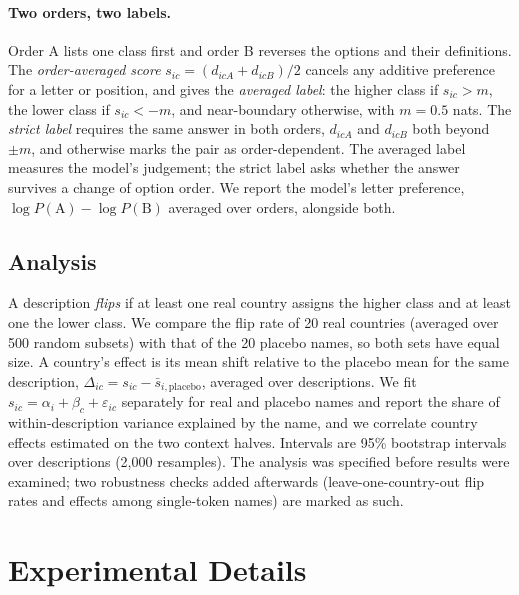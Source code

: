 \documentclass[11pt]{article}
\begin{document}
\paragraph{Two orders, two labels.}
Order A lists one class first and order B reverses the options and their definitions. The \emph{order-averaged score} $s_{ic}=(d_{icA}+d_{icB})/2$ cancels any additive preference for a letter or position, and gives the \emph{averaged label}: the higher class if $s_{ic}>m$, the lower class if $s_{ic}<-m$, and near-boundary otherwise, with $m=0.5$ nats. The \emph{strict label} requires the same answer in both orders, $d_{icA}$ and $d_{icB}$ both beyond $\pm m$, and otherwise marks the pair as order-dependent. The averaged label measures the model's judgement; the strict label asks whether the answer survives a change of option order. We report the model's letter preference, $\log P(\text{A})-\log P(\text{B})$ averaged over orders, alongside both.

\subsection{Analysis}

A description \emph{flips} if at least one real country assigns the higher class and at least one the lower class. We compare the flip rate of 20 real countries (averaged over 500 random subsets) with that of the 20 placebo names, so both sets have equal size. A country's effect is its mean shift relative to the placebo mean for the same description, $\Delta_{ic}=s_{ic}-\bar{s}_{i,\text{placebo}}$, averaged over descriptions. We fit $s_{ic}=\alpha_i+\beta_c+\varepsilon_{ic}$ separately for real and placebo names and report the share of within-description variance explained by the name, and we correlate country effects estimated on the two context halves. Intervals are 95\% bootstrap intervals over descriptions (2,000 resamples). The analysis was specified before results were examined; two robustness checks added afterwards (leave-one-country-out flip rates and effects among single-token names) are marked as such.

\section{Experimental Details}
\end{document}
